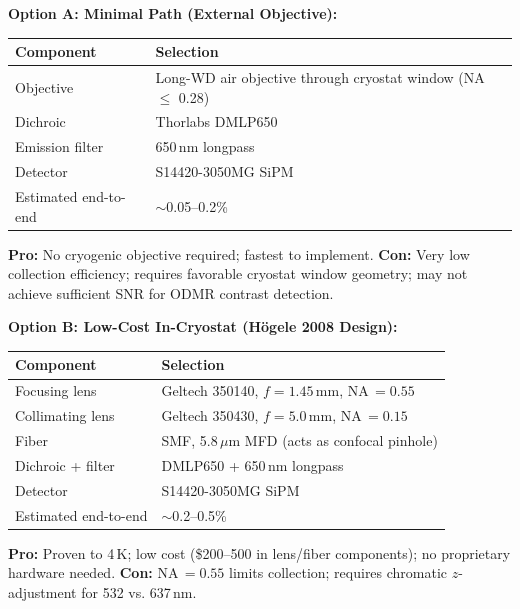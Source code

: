 \textbf{Option A: Minimal Path (External Objective):}
\begin{center}
\small
\begin{tabular}{ll}
\toprule
\textbf{Component} & \textbf{Selection} \\
\midrule
Objective & Long-WD air objective through cryostat window (NA $\leq$ 0.28) \\
Dichroic & Thorlabs DMLP650\cite{ThorlabsDMLP650_web} \\
Emission filter & 650\,nm longpass \\
Detector & S14420-3050MG SiPM\cite{S14420datasheet} \\
Estimated end-to-end & $\sim$0.05--0.2\% \\
\bottomrule
\end{tabular}
\end{center}
\textbf{Pro:} No cryogenic objective required; fastest to implement.
\textbf{Con:} Very low collection efficiency; requires favorable cryostat
window geometry; may not achieve sufficient SNR for ODMR contrast detection.

\textbf{Option B: Low-Cost In-Cryostat (H\"{o}gele 2008 Design):}
\begin{center}
\small
\begin{tabular}{ll}
\toprule
\textbf{Component} & \textbf{Selection} \\
\midrule
Focusing lens & Geltech 350140, $f = 1.45$\,mm, NA\,$= 0.55$\cite{Hogele2008} \\
Collimating lens & Geltech 350430, $f = 5.0$\,mm, NA\,$= 0.15$\cite{Hogele2008} \\
Fiber & SMF, 5.8\,$\mu$m MFD (acts as confocal pinhole)\cite{Hogele2008} \\
Dichroic + filter & DMLP650\cite{ThorlabsDMLP650_web} + 650\,nm longpass \\
Detector & S14420-3050MG SiPM\cite{S14420datasheet} \\
Estimated end-to-end & $\sim$0.2--0.5\% \\
\bottomrule
\end{tabular}
\end{center}
\textbf{Pro:} Proven to 4\,K; low cost (\$200--500 in lens/fiber components);
no proprietary hardware needed.
\textbf{Con:} NA\,$= 0.55$ limits collection; requires chromatic $z$-adjustment
for 532 vs. 637\,nm.\cite{Hogele2008}

